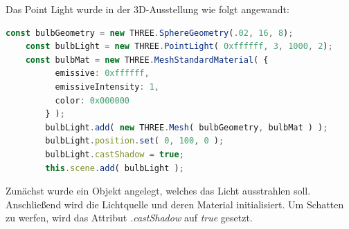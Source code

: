 Das Point Light wurde in der 3D-Ausstellung wie folgt angewandt:  
\begin{lstlisting}[caption={Lichtsetzung in der 3D-Ausstellung},language=TypeScript,label=lst:impl:pointlight]
    const bulbGeometry = new THREE.SphereGeometry(.02, 16, 8);
    const bulbLight = new THREE.PointLight( 0xffffff, 3, 1000, 2); 
    const bulbMat = new THREE.MeshStandardMaterial( {
          emissive: 0xffffff,
          emissiveIntensity: 1,
          color: 0x000000
        } );
        bulbLight.add( new THREE.Mesh( bulbGeometry, bulbMat ) );
        bulbLight.position.set( 0, 100, 0 );
        bulbLight.castShadow = true;
        this.scene.add( bulbLight );
\end{lstlisting}
Zunächst wurde ein Objekt angelegt, welches das Licht ausstrahlen soll. Anschließend wird die Lichtquelle und deren Material initialisiert. Um Schatten zu werfen, wird das Attribut \emph{.castShadow} auf \emph{true} gesetzt. 

